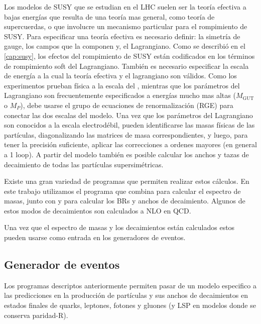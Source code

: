 Los modelos de SUSY que se estudian en el LHC suelen ser la teoría efectiva a
bajas energías que resulta de una teoría mas general, como teoría de
supercuerdas, o que involucre un mecanismo particular para el rompimiento de
SUSY. Para especificar una teoría efectiva es necesario definir: la simetría de
gauge, los campos que la componen y, el Lagrangiano. Como se describió en el
\cref{cap:susy}, los efectos del rompimiento de SUSY están codificados en los
términos de rompimiento soft del Lagrangiano. También es necesario especificar
la escala de energía a la cual la teoría efectiva y el lagrangiano son válidos.
Como los experimentos prueban física a la escala del {\tev}, mientras que los
parámetros del Lagrangiano son frecuentemente especificados a energías mucho mas
altas ($M_\text{GUT}$ o $M_P$), debe usarse el grupo de ecuaciones de
renormalización (RGE) para conectar las dos escalas del modelo. Una vez que los
parámetros del Lagrangiano son conocidos a la escala electrodébil, pueden
identificarse las masas físicas de las partículas, diagonalizando las matrices
de masa correspondientes, y luego, para tener la precisión suficiente, aplicar
las correcciones a ordenes mayores (en general a 1 loop). A partir del modelo
también es posible calcular los anchos y tazas de decaimiento de todas las
partículas supersimétricas.

Existe una gran variedad de programas que permiten realizar estos cálculos. En
este trabajo utilizamos el programa {\susyhit}\cite{Djouadi:2006bz} que combina
{\suspect}\cite{Djouadi2007426} para calcular el espectro de masas, junto con
{\sdecay}\cite{Muhlleitner:2004mka} y {\hdecay}\cite{Djouadi:1997yw} para
calcular los BRs y anchos de decaimiento. Algunos de estos modos de decaimientos
son calculados a NLO en QCD.

Una vez que el espectro de masas y los decaimientos están calculados estos
pueden usarse como entrada en los generadores de eventos.


\subsection{Generador de eventos}

Los programas descriptos anteriormente permiten pasar de un modelo especifico a las
predicciones en la producción de partículas y sus anchos de decaimientos en
estados finales de quarks, leptones, fotones y gluones (y LSP en modelos donde
se conserva paridad-R).


